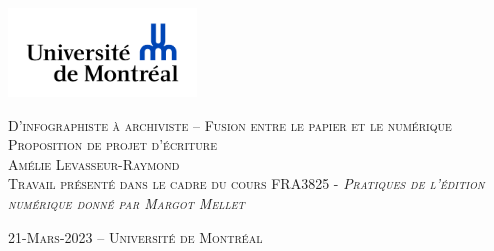 \documentclass[12pt,french,letterpaper]{article}
\subtitle{Proposition de projet d'écriture}
\author{Amélie    Levasseur-Raymond    Université de Montréal }
\date{}
\begin{document}

\begin{titlepage}%
\begin{center}
    \enlargethispage{2cm}
    
\includegraphics[width = 50mm]{logo} %

\vspace*{3cm}
\scshape\Huge D'infographiste à archiviste -- Fusion entre le papier et
le numérique\\
\normalfont\Large Proposition de projet d'écriture\\
\large \vspace*{3cm}
Amélie Levasseur-Raymond 
\\
\normalsize\vspace*{1cm}Travail présenté dans le cadre du cours FRA3825 - \em Pratiques
de l'édition numérique
 \normalfont donné par Margot Mellet 

\vspace*{3cm}
\end{center}

\vspace*{\fill}
\begin{flushright}
\end{flushright}

\begin{center}
\scshape\normalsize\vspace*{1cm} 21-Mars-2023 --      Université de
Montréal 
\\
\end{center}
\end{titlepage}




\newpage 
\end{document}
